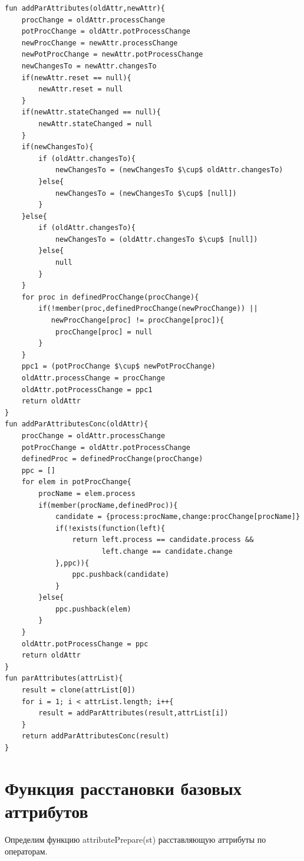 \begin{lstlisting}[style=PseudoStyle,mathescape=true]
fun addParAttributes(oldAttr,newAttr){
    procChange = oldAttr.processChange
    potProcChange = oldAttr.potProcessChange
    newProcChange = newAttr.processChange
    newPotProcChange = newAttr.potProcessChange
    newChangesTo = newAttr.changesTo
    if(newAttr.reset == null){
        newAttr.reset = null
    }
    if(newAttr.stateChanged == null){
        newAttr.stateChanged = null
    }
    if(newChangesTo){
        if (oldAttr.changesTo){
            newChangesTo = (newChangesTo $\cup$ oldAttr.changesTo)
        }else{
            newChangesTo = (newChangesTo $\cup$ [null])
        }
    }else{
        if (oldAttr.changesTo){
            newChangesTo = (oldAttr.changesTo $\cup$ [null])
        }else{
            null
        }
    }
    for proc in definedProcChange(procChange){
        if(!member(proc,definedProcChange(newProcChange)) ||
           newProcChange[proc] != procChange[proc]){
            procChange[proc] = null
        }
    }
    ppc1 = (potProcChange $\cup$ newPotProcChange)
    oldAttr.processChange = procChange
    oldAttr.potProcessChange = ppc1
    return oldAttr
}
fun addParAttributesConc(oldAttr){
    procChange = oldAttr.processChange
    potProcChange = oldAttr.potProcessChange
    definedProc = definedProcChange(procChange)
    ppc = []
    for elem in potProcChange{
        procName = elem.process
        if(member(procName,definedProc)){
            candidate = {process:procName,change:procChange[procName]}
            if(!exists(function(left){
                return left.process == candidate.process &&
                       left.change == candidate.change
            },ppc)){
                ppc.pushback(candidate)
            }
        }else{
            ppc.pushback(elem)
        }
    }
    oldAttr.potProcessChange = ppc
    return oldAttr
}
fun parAttributes(attrList){
    result = clone(attrList[0])
    for i = 1; i < attrList.length; i++{
        result = addParAttributes(result,attrList[i])
    }
    return addParAttributesConc(result)
}
\end{lstlisting}

\section{Функция расстановки базовых аттрибутов}
Определим функцию attributePrepare(st) расставляющую аттрибуты по операторам.

